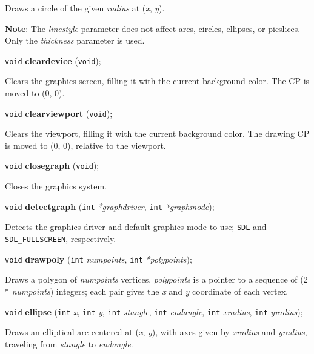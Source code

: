 \documentclass[a4paper,11pt]{article}
\newcommand{\V}{\texttt{void}}      %
\newcommand{\I}{\texttt{int}}       %
\newcommand{\func}[1]{\textbf{#1}}  %
\newcommand{\A}[1]{\emph{#1}}       %
\newcommand{\T}[1]{\texttt{#1}}     %
\newenvironment{bgi}
{ %
  \begin{snugshade}
}
{ %
  \end{snugshade}
}
\begin{document}
Draws a circle of the given \A{radius} at (\A{x}, \A{y}).

\textbf{Note}: The \A{linestyle} parameter does not affect arcs,
circles, ellipses, or pie\-slices. Only the \A{thickness} parameter is
used.


\begin{bgi}
\V{} \func{cleardevice} (\V{});
\end{bgi}

Clears the graphics screen, filling it with the current background
color. The CP is moved to (0, 0).


\begin{bgi}
\V{} \func{clearviewport} (\V{});
\end{bgi}

Clears the viewport, filling it with the current background color. The
drawing CP is moved to (0, 0), relative to the viewport.


\begin{bgi}
\V{} \func{closegraph} (\V{});
\end{bgi}

Closes the graphics system.


\begin{bgi}
\V{} \func{detectgraph} (\I{} \A{*graphdriver}, \I{} \A{*graphmode});
\end{bgi}

Detects the graphics driver and default graphics mode to use; \T{SDL}
and \T{SDL\_FULLSCREEN}, respectively.


\begin{bgi}
\V{} \func{drawpoly} (\I{} \A{numpoints}, \I{} \A{*polypoints});
\end{bgi}

Draws a polygon of \A{numpoints} vertices. \A{polypoints} is a
pointer to a sequence of (2 * \A{numpoints}) integers; each pair gives
the \A{x} and \A{y} coordinate of each vertex.


\begin{bgi}
\V{} \func{ellipse} (\I{} \A{x}, \I{} \A{y}, \I{} \A{stangle}, \I{}
\A{endangle}, \I{} \A{xradius}, \I{} \A{yradius});
\end{bgi}

Draws an elliptical arc centered at (\A{x}, \A{y}), with axes given by
\A{xradius} and \A{yradius}, traveling from \A{stangle} to
\A{endangle}.
\end{document}
